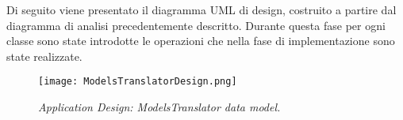 
Di seguito viene presentato il diagramma UML di design, costruito a partire dal diagramma di analisi precedentemente descritto. Durante questa fase per ogni classe sono state introdotte le operazioni che nella fase di implementazione sono state realizzate.
\raggedbottom
\begin{figure}[H]
	\centering
	\texttt{[image: ModelsTranslatorDesign.png]}
	\caption{\small{\textit{Application Design: ModelsTranslator data model.}}}
\end{figure}

